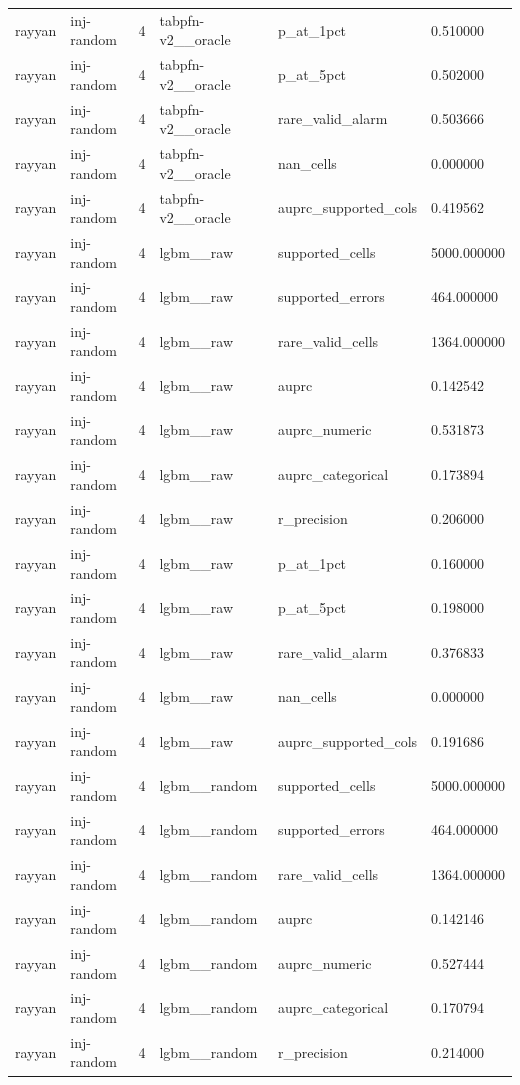 \begin{tabular}{llllll}
rayyan & inj-random & 4 & tabpfn-v2\_\_oracle & p\_at\_1pct & 0.510000 \\
rayyan & inj-random & 4 & tabpfn-v2\_\_oracle & p\_at\_5pct & 0.502000 \\
rayyan & inj-random & 4 & tabpfn-v2\_\_oracle & rare\_valid\_alarm & 0.503666 \\
rayyan & inj-random & 4 & tabpfn-v2\_\_oracle & nan\_cells & 0.000000 \\
rayyan & inj-random & 4 & tabpfn-v2\_\_oracle & auprc\_supported\_cols & 0.419562 \\
rayyan & inj-random & 4 & lgbm\_\_raw & supported\_cells & 5000.000000 \\
rayyan & inj-random & 4 & lgbm\_\_raw & supported\_errors & 464.000000 \\
rayyan & inj-random & 4 & lgbm\_\_raw & rare\_valid\_cells & 1364.000000 \\
rayyan & inj-random & 4 & lgbm\_\_raw & auprc & 0.142542 \\
rayyan & inj-random & 4 & lgbm\_\_raw & auprc\_numeric & 0.531873 \\
rayyan & inj-random & 4 & lgbm\_\_raw & auprc\_categorical & 0.173894 \\
rayyan & inj-random & 4 & lgbm\_\_raw & r\_precision & 0.206000 \\
rayyan & inj-random & 4 & lgbm\_\_raw & p\_at\_1pct & 0.160000 \\
rayyan & inj-random & 4 & lgbm\_\_raw & p\_at\_5pct & 0.198000 \\
rayyan & inj-random & 4 & lgbm\_\_raw & rare\_valid\_alarm & 0.376833 \\
rayyan & inj-random & 4 & lgbm\_\_raw & nan\_cells & 0.000000 \\
rayyan & inj-random & 4 & lgbm\_\_raw & auprc\_supported\_cols & 0.191686 \\
rayyan & inj-random & 4 & lgbm\_\_random & supported\_cells & 5000.000000 \\
rayyan & inj-random & 4 & lgbm\_\_random & supported\_errors & 464.000000 \\
rayyan & inj-random & 4 & lgbm\_\_random & rare\_valid\_cells & 1364.000000 \\
rayyan & inj-random & 4 & lgbm\_\_random & auprc & 0.142146 \\
rayyan & inj-random & 4 & lgbm\_\_random & auprc\_numeric & 0.527444 \\
rayyan & inj-random & 4 & lgbm\_\_random & auprc\_categorical & 0.170794 \\
rayyan & inj-random & 4 & lgbm\_\_random & r\_precision & 0.214000 \\

\end{tabular}
